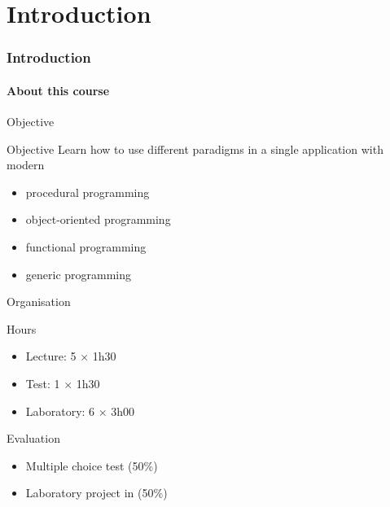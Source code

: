 \part{Introduction}

\section{Introduction}

\subsection{About this course}

\begin{frame}{Objective}{}
  \begin{block}{Objective}
    Learn how to use different paradigms in a single application with modern \CCLang

    \begin{itemize}
    \item
      procedural programming
    \item
      object-oriented programming
    \item
      functional programming
    \item
      generic programming
    \end{itemize}
  \end{block}
\end{frame}

\begin{frame}{Organisation}{}
  \begin{block}{Hours}
    \begin{itemize}
    \item
      Lecture: 5 $\times$ 1h30
    \item
      Test: 1 $\times$ 1h30
    \item
      Laboratory: 6 $\times$ 3h00
    \end{itemize}
  \end{block}

  \begin{block}{Evaluation}
    \begin{itemize}
    \item
      Multiple choice test (50\%)
    \item
      Laboratory project in \CCLang (50\%)
    \end{itemize}
  \end{block}
\end{frame}


